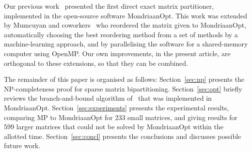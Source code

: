 Our previous work~\cite{pelt15} presented the first direct
exact matrix partitioner, implemented in the open-source software
MondriaanOpt. This work was extended by Mumcuyan
and coworkers~\cite{mumcuyan18} who 
reordered the matrix given to MondriaanOpt,
automatically choosing the best reordering method
from a set of methods by a machine-learning approach,
and by parallelising the software for a shared-memory computer
using OpenMP. 
Our own improvements, in the present article,
are orthogonal to these extensions,
so that they can be combined.  

The remainder of this paper is organised as follows:
Section~\ref{sec:np} presents the NP-completeness proof 
for sparse matrix bipartitioning.
Section~\ref{sec:opt} briefly reviews the
branch-and-bound algorithm of~\cite{pelt15}
that was implemented in MondriaanOpt.
Section~\ref{sec:experiments} presents the experimental results,
comparing MP to MondriaanOpt for 233 small matrices, 
and giving results for 599 larger matrices that could not be solved
by MondriaanOpt within the allotted time.
Section~\ref{sec:concl} presents the conclusions and discusses possible future
work.

